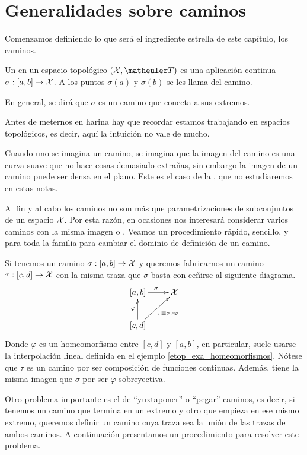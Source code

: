 \section{Generalidades sobre caminos}
Comenzamos definiendo lo que será el ingrediente estrella de este capítulo, los caminos.
\begin{defi}[Camino]
	Un  en un espacio topológico $(\X,\T)$ es una aplicación continua $\sigma:[a,b]\to\mathcal{X}$. A los puntos $\sigma(a)$ y $\sigma(b)$ se les llama  del camino.
	
	En general, se dirá que $\sigma$ es un camino que conecta a sus extremos.
\end{defi}
Antes de meternos en harina hay que recordar estamos trabajando en espacios topológicos, es decir, aquí la intuición no vale de mucho.
\begin{obs}
	Cuando uno se imagina un camino, se imagina que la imagen del camino es una curva suave que no hace cosas demasiado extrañas, sin embargo la imagen de un camino puede ser densa en el plano. Este es el caso de la , que no estudiaremos en estas notas.
\end{obs}
Al fin y al cabo los caminos no son más que parametrizaciones de subconjuntos de un espacio $\mathcal{X}$. Por esta razón, en ocasiones nos interesará considerar varios caminos con la misma imagen o . Veamos un procedimiento rápido, sencillo, y para toda la familia para cambiar el dominio de definición de un camino.
\begin{obs}[Reparametrización]
	\label{cam_obs_reparam}
	Si tenemos un camino $\sigma:[a,b]\to\mathcal{X}$ y queremos fabricarnos un camino $\tau:[c,d]\to\mathcal{X}$ con la misma traza que $\sigma$ basta con ceñirse al siguiente diagrama.
	\begin{equation*}
		\xymatrix{
			[a,b]\ar[r]^{\sigma}& \X\\
			[c,d]\ar[u]^{\varphi}\ar[ur]_{\tau\equiv\sigma\circ\varphi}
		}
	\end{equation*}
	Donde $\varphi$ es un homeomorfismo entre $[c,d]$ y $[a,b]$, en particular, suele usarse la interpolación lineal definida en el ejemplo \ref{etop_exa_homeomorfismos}. Nótese que $\tau$ es un camino por ser composición de funciones continuas. Además, tiene la misma imagen que $\sigma$ por ser $\varphi$ sobreyectiva.
\end{obs}
Otro problema importante es el de ``yuxtaponer'' o ``pegar'' caminos, es decir, si tenemos un camino que termina en un extremo y otro que empieza en ese mismo extremo, queremos definir un camino cuya traza sea la unión de las trazas de ambos caminos. A continuación presentamos un procedimiento para resolver este problema.
